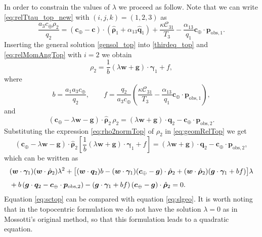 \documentclass[11pt]{article}
\def\angmom{\bm{c}}
\def\bq{\bm{q}}
\def\rhovec{{\bm{\rho}}}
\def\angmom{{\bm{c}}}
\begin{document}
In order to constrain the values of $\lambda$ we proceed as follow.
Note that we can write \eqref{eq:relTtau_top_new} with $(i,j,k) = (1,2,3)$ as
\begin{equation}
    \frac{a_3 c_\oplus\rho_2}{q_2} = \left(\bm{c}_\oplus-\bm{c}\right)\cdot
        \left(\hat{\bm{\rho}}_1
        +\alpha_{13}\hat{\bm{q}}_1\right) + \frac{\kappa\mathcal{C}_{31}}{T_3} -\frac{\alpha_{13}}{q_1}\bm{c}_\oplus\cdot\bm{p}_{\text{obs},1}.
\label{thirdeq_top}
\end{equation}
%
Inserting the general solution \eqref{gensol_top} into \eqref{thirdeq_top} and \eqref{eq:relMomAngTop} {with $i=2$} we obtain
%
\begin{equation}
    {\rho}_2 = \frac{1}{b}(\lambda\bm{w}+\bm{g})\cdot\bm{\gamma}_1
    + f,
    \label{eq:rho2normTop}
\end{equation}
where
\begin{equation}
    b = \frac{a_1a_3c_\oplus}{q_2}, \qquad
    f=\frac{q_2}{a_3c_\oplus}\left(\frac{\kappa\mathcal{C}_{31}}{T_3} -\frac{\alpha_{13}}{q_1}\bm{c}_\oplus\cdot\bm{p}_{\text{obs},1} \right),
\label{bieffe}
\end{equation}
%
and
%
\begin{equation}
    \left(\angmom_\oplus - \lambda\bm{w} - \bm{g}\right)\cdot\hat{\rhovec}_2\,\rho_2
    = (\lambda\bm{w} + \bm{g})\cdot\bq_2
    - \angmom_\oplus \cdot \bm{p}_{\text{obs},2}.
    \label{eq:geomRelTop}
\end{equation}
%
Substituting the expression \eqref{eq:rho2normTop} of $\rho_2$ in \eqref{eq:geomRelTop} we get
%
\begin{equation*}
    \left(\angmom_\oplus - \lambda\bm{w} - \bm{g}\right)\cdot\hat{\rhovec}_2\left[ 
    \frac{1}{b}(\lambda\bm{w}+\bm{g})\cdot\bm{\gamma}_1 + f
    \right]= (\lambda\bm{w} + \bm{g})\cdot\bq_2 - \angmom_\oplus\cdot\bm{p}_{\text{obs},2},
\end{equation*}
%
which can be written as
%
\begin{equation}\label{eq:sctop}
    \begin{split}
    & (\bm{w}\cdot{\bm{\gamma}}_1)(\bm{w}\cdot\hat{\bm{\rho}}_2)\lambda^2
    +\bigl[(\bm{w}\cdot{\bm{q}}_2)b
    - (\bm{w}\cdot\bm{\gamma}_1)(\bm{c}_\oplus-\bm{g})\cdot\hat{\bm{\rho}}_2
    + (\bm{w}\cdot{\hat{\bm\rho}}_2)(\bm{g}\cdot\bm{\gamma}_1
    + b f)\bigr]\lambda\\[1ex]
    & + b\left(\bm{g}\cdot{\bm{q}_2}-\bm{c}_\oplus\cdot\bm{p}_{\rm{obs},2}\right)
    - \left(\bm{g}\cdot\bm{\gamma}_1+ b f\right)(\bm{c}_\oplus-\bm{g})\cdot\hat{\bm{\rho}}_2 = 0.
    \end{split}
\end{equation}
%
Equation \eqref{eq:sctop} can be compared with equation \eqref{eq:slgeo}.  
It is worth noting that in the topocentric formulation we do not have the solution $\lambda= 0$ as in Mossotti's original method, so that this formulation leads to a quadratic equation.
\end{document}
